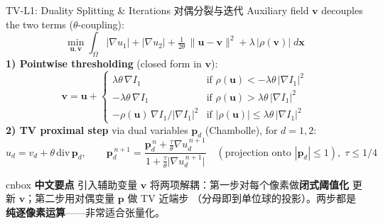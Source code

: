 \documentclass[aspectratio=169,10pt]{beamer}
\newcommand{\zh}[1]{{\zhfont #1}}
\newenvironment{cn}{%
  \begin{beamercolorbox}[rounded=true,sep=4pt,wd=\textwidth]{cnbox}\zhfont\footnotesize
  {\color{cblue!70!black}\textbf{中文要点}}\quad}%
  {\end{beamercolorbox}}
\begin{document}
\begin{frame}{TV-L1: Duality Splitting \& Iterations \zh{对偶分裂与迭代}}
  Auxiliary field $\mathbf{v}$ decouples the two terms ($\theta$-coupling):
  \begin{equation*}
    \min_{\mathbf{u},\mathbf{v}} \int_{\Omega}
      |\nabla u_1| + |\nabla u_2|
      + \tfrac{1}{2\theta}\,\|\mathbf{u}-\mathbf{v}\|^2
      + \lambda\,|\rho(\mathbf{v})| \; d\mathbf{x}
  \end{equation*}
  \textbf{1) Pointwise thresholding} (closed form in $\mathbf{v}$):
  \begin{equation*}
    \mathbf{v} = \mathbf{u} +
    \begin{cases}
      \lambda\theta\,\nabla I_1 & \text{if } \rho(\mathbf{u}) < -\lambda\theta\,|\nabla I_1|^2\\
      -\lambda\theta\,\nabla I_1 & \text{if } \rho(\mathbf{u}) > \lambda\theta\,|\nabla I_1|^2\\
      -\rho(\mathbf{u})\,\nabla I_1 / |\nabla I_1|^2 & \text{if } |\rho(\mathbf{u})| \le \lambda\theta\,|\nabla I_1|^2
    \end{cases}
  \end{equation*}
  \textbf{2) TV proximal step} via dual variables $\mathbf{p}_d$ (Chambolle),
  for $d=1,2$:
  \begin{equation*}
    u_d = v_d + \theta\,\mathrm{div}\,\mathbf{p}_d, \qquad
    \mathbf{p}_d^{\,n+1} =
      \frac{\mathbf{p}_d^{\,n} + \tfrac{\tau}{\theta}\nabla u_d^{\,n+1}}
           {1 + \tfrac{\tau}{\theta}\bigl|\nabla u_d^{\,n+1}\bigr|}
    \quad (\text{projection onto } |\mathbf{p}_d|\le 1),\; \tau \le 1/4
  \end{equation*}
  \begin{cn}
    引入辅助变量 $\mathbf{v}$ 将两项解耦：第一步对每个像素做\textbf{闭式阈值化}
    更新 $\mathbf{v}$；第二步用对偶变量 $\mathbf{p}$ 做 TV 近端步
    （分母即到单位球的投影）。两步都是\textbf{纯逐像素运算}——非常适合张量化。
  \end{cn}
\end{frame}
\end{document}

